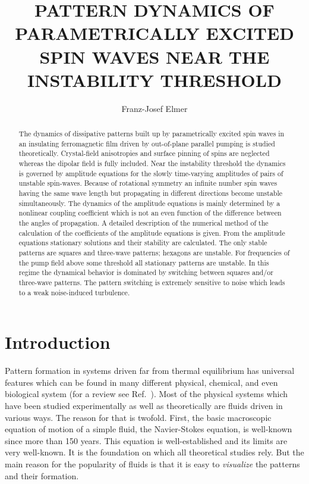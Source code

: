 \setlength{\textheight}{25cm}  %
 
\draft
\title{PATTERN DYNAMICS OF PARAMETRICALLY EXCITED SPIN WAVES NEAR THE 
   INSTABILITY THRESHOLD}
\author{Franz-Josef Elmer}
\address{Institut f\"ur Physik, Universit\"at 
   Basel, CH-4056 Basel, Switzerland}
\maketitle
\begin{abstract}
The dynamics of dissipative patterns built up by parametrically
excited spin waves in an insulating ferromagnetic film driven by
out-of-plane parallel pumping is studied theoretically. Crystal-field
anisotropies and surface pinning of spins are neglected whereas the
dipolar field is fully included. Near the instability threshold the
dynamics is governed by amplitude equations for the slowly
time-varying amplitudes of pairs of unstable spin-waves. Because of
rotational symmetry an infinite number spin waves having the same
wave length but propagating in different directions become unstable 
simultaneously. 
The dynamics of the amplitude equations is mainly determined by
a nonlinear coupling coefficient which is not an even function of
the difference between the angles of propagation.  A detailed
description of the numerical method of the calculation of the
coefficients of the amplitude equations is given.  From the amplitude
equations stationary solutions and their stability are calculated.
The only stable patterns are squares and three-wave patterns;
hexagons are unstable. For frequencies of the pump field above some
threshold all stationary patterns are unstable. In this regime the
dynamical behavior is dominated by switching between squares and/or
three-wave patterns. The pattern switching is extremely sensitive to
noise which leads to a weak noise-induced turbulence.
\end{abstract}

\narrowtext

\section{\protect\label{s.intro}Introduction}

Pattern formation in systems driven far from thermal equilibrium has
universal features which can be found in many different physical,
chemical, and even biological system (for a review see
Ref.~). Most of the physical systems which have
been studied experimentally as well as theoretically are fluids
driven in various ways. The reason for that is twofold. First, the
basic macroscopic equation of motion of a simple fluid, the
Navier-Stokes equation, is well-known since more than 150 years. This
equation is well-established and its limits are very well-known. It
is the foundation on which all theoretical studies rely. But the main
reason for the popularity of fluids is that it is easy to {\em
visualize\/} the patterns and their formation. 

